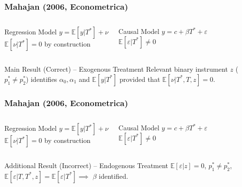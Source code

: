 \documentclass{beamer}
\begin{document}
\begin{frame}
  \frametitle{Mahajan (2006, Econometrica)}
    \begin{columns}[c]
    \begin{exampleblock}{Regression Model}
      $y = \mathbb{E}[y|T^*] + \nu$\\
      {\small $\mathbb{E}[\nu|T^*]=0$ by construction}
    \end{exampleblock}
    \begin{exampleblock}{Causal Model}
     $y = c + \beta T^* + \varepsilon$\\
     {\small$\mathbb{E}[\varepsilon|T^*]\neq 0$}
    \end{exampleblock}
    \end{columns}

    \vspace{1.5em}
  
  \begin{block}{Main Result (Correct) -- Exogenous Treatment}
   Relevant binary instrument $z$ ($p^*_1 \neq p^*_2$) identifies $\alpha_0, \alpha_1$ and $\mathbb{E}[y|T^*]$ provided that $\mathbb{E}[\nu|T^*,T,z]=0$. 
  \end{block}
\end{frame}
\begin{frame}
  \frametitle{Mahajan (2006, Econometrica)}
    \begin{columns}[c]
    \begin{exampleblock}{Regression Model}
      $y = \mathbb{E}[y|T^*] + \nu$\\
      {\small $\mathbb{E}[\nu|T^*]=0$ by construction}
    \end{exampleblock}
    \begin{exampleblock}{Causal Model}
     $y = c + \beta T^* + \varepsilon$\\
     {\small$\mathbb{E}[\varepsilon|T^*]\neq 0$}
    \end{exampleblock}
    \end{columns}

    \vspace{1.5em}

  \begin{alertblock}{Additional Result (Incorrect) -- Endogenous Treatment}
    $\mathbb{E}[\varepsilon|z]=0$, $p^*_1 \neq p^*_2$, $\mathbb{E}[\varepsilon|T,T^*,z]=\mathbb{E}[\varepsilon|T^*] \implies$ $\beta$ identified.
  \end{alertblock}
\end{frame}
\end{document}
